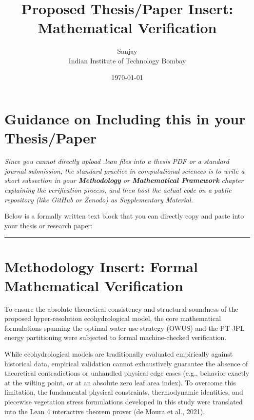 \documentclass[12pt,a4paper]{article}
\title{\textbf{Proposed Thesis/Paper Insert: Mathematical Verification}}
\author{Sanjay \\ Indian Institute of Technology Bombay}
\date{\today}
\begin{document}
\maketitle
\thispagestyle{empty}

\section*{Guidance on Including this in your Thesis/Paper}
\textit{Since you cannot directly upload .lean files into a thesis PDF or a standard journal submission, the standard practice in computational sciences is to write a short subsection in your \textbf{Methodology} or \textbf{Mathematical Framework} chapter explaining the verification process, and then host the actual code on a public repository (like GitHub or Zenodo) as Supplementary Material.}

\vspace{0.5cm}
\noindent Below is a formally written text block that you can directly copy and paste into your thesis or research paper:

\rule{\textwidth}{0.4pt}
\vspace{0.3cm}

\section*{Methodology Insert: Formal Mathematical Verification}

To ensure the absolute theoretical consistency and structural soundness of the proposed hyper-resolution ecohydrological model, the core mathematical formulations spanning the optimal water use strategy (OWUS) and the PT-JPL energy partitioning were subjected to formal machine-checked verification. 

While ecohydrological models are traditionally evaluated empirically against historical data, empirical validation cannot exhaustively guarantee the absence of theoretical contradictions or unhandled physical edge cases (e.g., behavior exactly at the wilting point, or at an absolute zero leaf area index). To overcome this limitation, the fundamental physical constraints, thermodynamic identities, and piecewise vegetation stress formulations developed in this study were translated into the Lean 4 interactive theorem prover (de Moura et al., 2021). 
\end{document}
